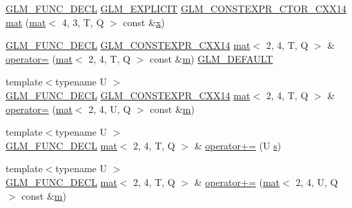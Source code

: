 \begin{DoxyCompactItemize}
\item 
\hyperlink{setup_8hpp_ab2d052de21a70539923e9bcbf6e83a51}{G\+L\+M\+\_\+\+F\+U\+N\+C\+\_\+\+D\+E\+CL} \hyperlink{setup_8hpp_a6c74f5a5e7b134ab69023ff9a30d4d5d}{G\+L\+M\+\_\+\+E\+X\+P\+L\+I\+C\+IT} \hyperlink{setup_8hpp_a0900f9145e68bf6061b6f5e7be3fa751}{G\+L\+M\+\_\+\+C\+O\+N\+S\+T\+E\+X\+P\+R\+\_\+\+C\+T\+O\+R\+\_\+\+C\+X\+X14} \hyperlink{structglm_1_1mat_3_012_00_014_00_01_t_00_01_q_01_4_addaf64b8bf06e6485613afe876a4f4ac}{mat} (\hyperlink{structglm_1_1mat}{mat}$<$ 4, 3, T, Q $>$ const \&\hyperlink{_s_d_l__opengl_8h_ad0e63d0edcdbd3d79554076bf309fd47}{x})
\item 
\hyperlink{setup_8hpp_ab2d052de21a70539923e9bcbf6e83a51}{G\+L\+M\+\_\+\+F\+U\+N\+C\+\_\+\+D\+E\+CL} \hyperlink{setup_8hpp_a4dd12abf5e1164bc57f3a34671d03844}{G\+L\+M\+\_\+\+C\+O\+N\+S\+T\+E\+X\+P\+R\+\_\+\+C\+X\+X14} \hyperlink{structglm_1_1mat}{mat}$<$ 2, 4, T, Q $>$ \& \hyperlink{structglm_1_1mat_3_012_00_014_00_01_t_00_01_q_01_4_a3616702a1f09e39ffcd49032a89432c7}{operator=} (\hyperlink{structglm_1_1mat}{mat}$<$ 2, 4, T, Q $>$ const \&\hyperlink{_s_d_l__opengl__glext_8h_af593500c283bf1a787a6f947f503a5c2}{m}) \hyperlink{setup_8hpp_aefce7051c376a64ba89fa93a9f63bc2c}{G\+L\+M\+\_\+\+D\+E\+F\+A\+U\+LT}
\item 
{\footnotesize template$<$typename U $>$ }\\\hyperlink{setup_8hpp_ab2d052de21a70539923e9bcbf6e83a51}{G\+L\+M\+\_\+\+F\+U\+N\+C\+\_\+\+D\+E\+CL} \hyperlink{setup_8hpp_a4dd12abf5e1164bc57f3a34671d03844}{G\+L\+M\+\_\+\+C\+O\+N\+S\+T\+E\+X\+P\+R\+\_\+\+C\+X\+X14} \hyperlink{structglm_1_1mat}{mat}$<$ 2, 4, T, Q $>$ \& \hyperlink{structglm_1_1mat_3_012_00_014_00_01_t_00_01_q_01_4_ae87ff600b214915268b087c314e3cdf8}{operator=} (\hyperlink{structglm_1_1mat}{mat}$<$ 2, 4, U, Q $>$ const \&\hyperlink{_s_d_l__opengl__glext_8h_af593500c283bf1a787a6f947f503a5c2}{m})
\item 
{\footnotesize template$<$typename U $>$ }\\\hyperlink{setup_8hpp_ab2d052de21a70539923e9bcbf6e83a51}{G\+L\+M\+\_\+\+F\+U\+N\+C\+\_\+\+D\+E\+CL} \hyperlink{structglm_1_1mat}{mat}$<$ 2, 4, T, Q $>$ \& \hyperlink{structglm_1_1mat_3_012_00_014_00_01_t_00_01_q_01_4_a9db5a3048b0256fb313cdd6a41da96a1}{operator+=} (U \hyperlink{_s_d_l__opengl_8h_a4af680a6c683f88ed67b76f207f2e6e4}{s})
\item 
{\footnotesize template$<$typename U $>$ }\\\hyperlink{setup_8hpp_ab2d052de21a70539923e9bcbf6e83a51}{G\+L\+M\+\_\+\+F\+U\+N\+C\+\_\+\+D\+E\+CL} \hyperlink{structglm_1_1mat}{mat}$<$ 2, 4, T, Q $>$ \& \hyperlink{structglm_1_1mat_3_012_00_014_00_01_t_00_01_q_01_4_aa1d0289966cfba6918cdbdab0eb6d894}{operator+=} (\hyperlink{structglm_1_1mat}{mat}$<$ 2, 4, U, Q $>$ const \&\hyperlink{_s_d_l__opengl__glext_8h_af593500c283bf1a787a6f947f503a5c2}{m})

\end{DoxyCompactItemize}
